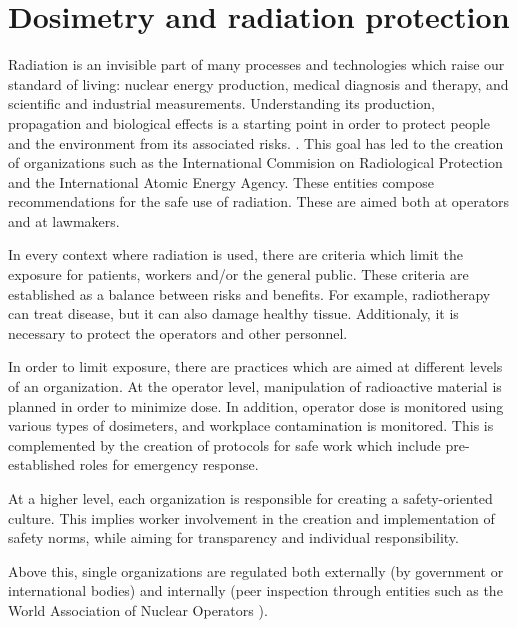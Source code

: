 \section{Dosimetry and radiation protection}
Radiation is an invisible part of many processes
and technologies which raise our standard of living:
nuclear energy production, medical diagnosis and therapy,
and scientific and industrial measurements.
Understanding its production, propagation and biological effects
is a starting point in order to protect people and the environment
from its associated risks.
\cite{iaea_radiation_????}.
This goal has led to the creation of organizations such as the
International Commision on Radiological Protection
\cite{_icrp_????} and the International Atomic Energy
Agency\cite{iaea_official_????}.
These entities compose recommendations for the safe use of radiation.
These are aimed both at operators and at lawmakers.

In every context where radiation is used,
there are criteria which limit the exposure for
patients, workers and/or the general public.
These criteria are established as a balance between risks and benefits.
For example, radiotherapy can treat disease,
but it can also damage healthy tissue.
Additionaly, it is necessary to protect the operators and other personnel.

In order to limit exposure, 
there are practices which are aimed at different levels of an organization.
At the operator level,
manipulation of radioactive material is planned in order to minimize dose.
In addition, operator dose is monitored using various types of dosimeters,
and workplace contamination is monitored.
This is complemented by the creation of protocols for safe work
which include pre-established roles for emergency response.

At a higher level, each organization is responsible for creating a safety-oriented culture.
This implies worker involvement in the creation and implementation of safety norms,
while aiming for transparency and individual responsibility.

Above this, single organizations are regulated both externally
(by government or international bodies)
and internally (peer inspection through entities such as the
World Association of Nuclear Operators
\cite{washington_practice_1997}).
